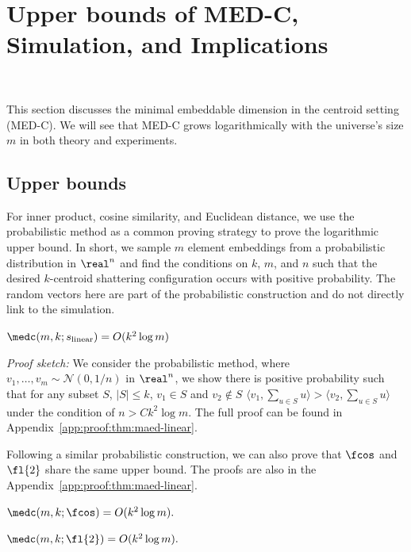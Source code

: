 \section{Upper bounds of MED-C, Simulation, and Implications}~\label{sec:maed_and_exp}

This section discusses the minimal embeddable dimension in the centroid setting (MED-C).
We will see that MED-C grows logarithmically with the universe's size $m$ in both theory and experiments.

\subsection{Upper bounds}

For inner product, cosine similarity, and Euclidean distance, we use the probabilistic method as a common proving strategy to prove the logarithmic upper bound. In short, we sample $m$ element embeddings from a probabilistic distribution in $\real^n$ and find the conditions on $k$, $m$, and $n$ such that the desired $k$-centroid shattering configuration occurs with positive probability. The random vectors here are part of the probabilistic construction and do not directly link to the simulation.

\begin{theorem}\label{thm:medc-linear}
    $\medc(m, k; s_{\rm linear})=O(k^2\log m)$
\end{theorem}
\noindent\textit{Proof sketch:} We consider the probabilistic method, where $v_1, \dots, v_m \sim \mathcal{N}(0, 1/n)$ in $\real^n$, we show there is positive probability such that for any subset $S$, $|S|\leq k$, $v_1\in S$ and $v_2\notin S$
$ \langle v_1, \sum_{u\in S} u \rangle > \langle v_2 ,  \sum_{u\in S} u \rangle$ under the condition of $n>Ck^2\log m$. The full proof can be found in Appendix~\ref{app:proof:thm:maed-linear}.

Following a similar probabilistic construction, we can also prove that $\fcos$ and $\fl{2}$ share the same upper bound. The proofs are also in the Appendix~\ref{app:proof:thm:maed-linear}.
\begin{theorem}\label{thm:medc-cos}
$\medc(m, k; \fcos)=O(k^2\log m).$
\end{theorem}
\begin{theorem}\label{thm:medc-l2}
$\medc(m, k; \fl{2})=O(k^2\log m).$
\end{theorem}

